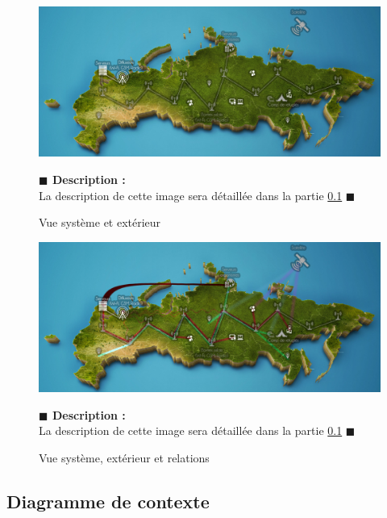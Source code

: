 \documentclass[11pt, titlepage]{report}
\newcommand{\debutDescription}{\noindent\textbf{\textcolor{DescriptionColor}{$\blacksquare$  Description : \\}}}
\newcommand{\finDescription}{\noindent\textcolor{DescriptionColor}{$\blacksquare$}}
\begin{document}
\begin{figure}[h!]
\begin{center}
\includegraphics[scale=.18]{../images/schemas/humanitaire_system_external.png}
\caption{Vue système et extérieur}
\end{center}
\debutDescription
La description de cette image sera détaillée dans la partie \ref{subsec:contexte}
\finDescription
\end{figure}


\begin{figure}[h!]
\begin{center}
\includegraphics[scale=.18]{../images/schemas/humanitaire_system_external_links.png}
\caption{Vue système, extérieur et relations}
\end{center}
\debutDescription
La description de cette image sera détaillée dans la partie \ref{subsec:contexte}
\finDescription
\end{figure}
\clearpage
\subsection{Diagramme de contexte}
\label{subsec:contexte}
\end{document}
